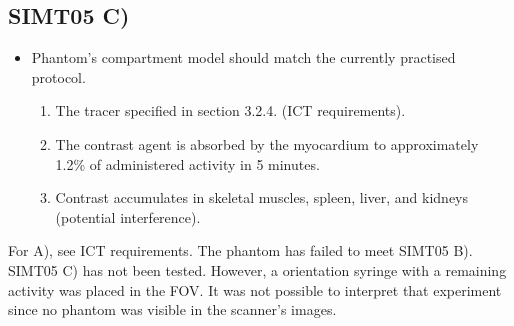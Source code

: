 \subsection*{SIMT05 C)}
\begin{itemize}
	\item Phantom’s compartment model should match the currently practised protocol.
	\begin{enumerate}[label=\Alph*, noitemsep]
		\item The tracer specified in section 3.2.4. (ICT requirements).
		\item The contrast agent is absorbed by the myocardium to approximately 1.2\% of administered activity in 5 minutes.
		\item Contrast accumulates in skeletal muscles, spleen, liver, and kidneys (potential interference).
	\end{enumerate}
\end{itemize}
For A), see ICT requirements. The phantom has failed to meet SIMT05 B). SIMT05 C) has not been tested. However, a orientation syringe with a remaining activity was placed in the FOV. It was not possible to interpret that experiment since no phantom was visible in the scanner's images.



